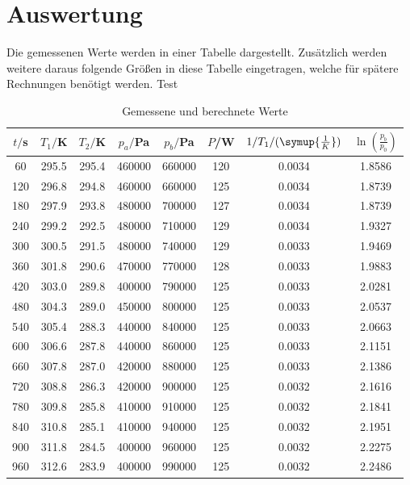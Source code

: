 \section{Auswertung}
\label{sec:Auswertung}
Die gemessenen Werte werden in einer Tabelle dargestellt. Zusätzlich werden weitere
daraus folgende Größen in diese Tabelle eingetragen, welche für spätere Rechnungen
benötigt werden. Test
\begin{table}[H]
  \centering
  \caption{Gemessene und berechnete Werte}
  \label{tab:Werte}
  \begin{tabular}{c c c c c c c c}
    \toprule
    $t/$s & $T_1/$K & $T_2/$K & $p_a/$Pa & $p_b/$Pa & $P$/W & $1/T_1/(\symup{\frac{1}{K}})$ & $\ln(\frac{p_b}{p_0})$ \\
    \midrule
      60  &  295.5 &  295.4 & 460000  &  660000 & 120 & 0.0034 & 1.8586 \\
     120  &  296.8 &  294.8 & 460000  &  660000 & 125 & 0.0034 & 1.8739 \\
     180  &  297.9 &  293.8 & 480000  &  700000 & 127 & 0.0034 & 1.8739 \\
     240  &  299.2 &  292.5 & 480000  &  710000 & 129 & 0.0034 & 1.9327 \\
     300  &  300.5 &  291.5 & 480000  &  740000 & 129 & 0.0033 & 1.9469 \\
     360  &  301.8 &  290.6 & 470000  &  770000 & 128 & 0.0033 & 1.9883 \\
     420  &  303.0 &  289.8 & 400000  &  790000 & 125 & 0.0033 & 2.0281 \\
     480  &  304.3 &  289.0 & 450000  &  800000 & 125 & 0.0033 & 2.0537 \\
     540  &  305.4 &  288.3 & 440000  &  840000 & 125 & 0.0033 & 2.0663 \\
     600  &  306.6 &  287.8 & 440000  &  860000 & 125 & 0.0033 & 2.1151 \\
     660  &  307.8 &  287.0 & 420000  &  880000 & 125 & 0.0033 & 2.1386 \\
     720  &  308.8 &  286.3 & 420000  &  900000 & 125 & 0.0032 & 2.1616 \\
     780  &  309.8 &  285.8 & 410000  &  910000 & 125 & 0.0032 & 2.1841 \\
     840  &  310.8 &  285.1 & 410000  &  940000 & 125 & 0.0032 & 2.1951 \\
     900  &  311.8 &  284.5 & 400000  &  960000 & 125 & 0.0032 & 2.2275 \\
     960  &  312.6 &  283.9 & 400000  &  990000 & 125 & 0.0032 & 2.2486 \\

\end{tabular}
\end{table}
